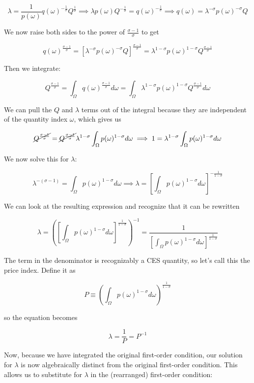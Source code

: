 \documentclass[12pt, letterpaper]{article}
\begin{document}
	\[ \lambda = \frac{1}{p(\omega)} q(\omega)^{-\frac{1}{\sigma}} Q^{\frac{1}{\sigma}} \implies \lambda p(\omega) Q^{-\frac{1}{\sigma}} = q(\omega)^{-\frac{1}{\sigma}}  \implies q(\omega) = \lambda^{-\sigma} p(\omega)^{-\sigma} Q    \]
	
	We now raise both sides to the power of \( \frac{\sigma - 1}{\sigma} \) to get 

	\[ q(\omega)^{\frac{\sigma - 1}{\sigma}} = \left[\lambda^{-\sigma} p(\omega)^{-\sigma} Q\right]^{\frac{\sigma - 1}{\sigma}} = \lambda^{1 - \sigma} p(\omega)^{1 - \sigma} Q^{\frac{\sigma - 1}{\sigma}} \]

	Then we integrate:

	\[ Q^{\frac{\sigma - 1}{\sigma}} = \int_{\Omega} q(\omega)^{\frac{\sigma - 1}{\sigma}} d\omega = \int_{\Omega} \lambda^{1 - \sigma} p(\omega)^{1 - \sigma} Q^{\frac{\sigma - 1}{\sigma}}  d\omega    \]

	We can pull the \(Q\) and \(\lambda\) terms out of the integral because they are independent of the quantity index \(\omega\), which gives us

	\[ \cancel{Q^{\frac{\sigma - 1}{\sigma}}} = \cancel{Q^{\frac{\sigma - 1}{\sigma}}} \lambda^{1 - \sigma} \int_{\Omega} p(\omega)^{1 - \sigma} d\omega \implies 1 =  \lambda^{1 - \sigma} \int_{\Omega} p(\omega)^{1 - \sigma} d\omega     \]

	We now solve this for \(\lambda\):

	\[ \lambda^{- (\sigma - 1)} = \int_{\Omega} p(\omega)^{1 - \sigma} d\omega \implies \lambda = \left[ \int_{\Omega} p(\omega)^{1 - \sigma} d\omega \right]^{- \frac{1}{1 - \sigma}}  \]

	We can look at the resulting expression and recognize that it can be rewritten

	\[ \lambda = \left(\left[ \int_{\Omega} p(\omega)^{1 - \sigma} d\omega \right]^{\frac{1}{1 - \sigma}}\right)^{-1} = \frac{1}{\left[ \int_{\Omega} p(\omega)^{1 - \sigma} d\omega \right]^{\frac{1}{1 - \sigma}}}  \]

	The term in the denominator is recognizably a CES quantity, so let's call this the price index. Define it as

	\[ P \equiv \left( \int_{\Omega} p(\omega)^{1 - \sigma} d\omega \right)^{\frac{1}{1 - \sigma}}  \]

	so the equation becomes

	\[ \lambda = \frac{1}{P} = P^{-1} \]

	Now, because we have integrated the original first-order condition, our solution for \(\lambda\) is now algebraically distinct from the original first-order condition. This allows us to substitute for \(\lambda\) in the (rearranged) first-order condition:
\end{document}
